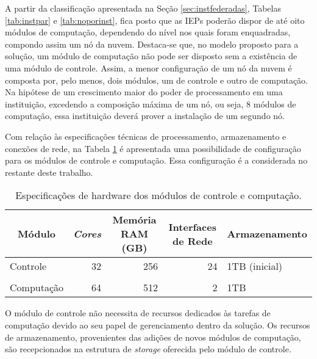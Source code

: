 \documentclass[tese,capa]{texufpel}
\begin{document}
A partir da classificação apresentada na Seção \ref{sec:instfederadas}, Tabelas \ref{tab:instpar} e \ref{tab:noporinst}, fica posto que as IEPs poderão dispor de até oito módulos de computação, dependendo do nível nos quais foram enquadradas, compondo assim um nó da nuvem. Destaca-se que, no modelo proposto para a solução, um módulo de computação não pode ser disposto sem a existência de uma módulo de controle. Assim, a menor configuração de um nó da nuvem é composta por, pelo menos, dois módulos, um de controle e outro de computação. Na hipótese de um crescimento maior do poder de processamento em uma instituição, excedendo a composição máxima de um nó, ou seja, 8 módulos de computação, essa instituição deverá prover a instalação de um segundo nó.

Com relação às especificações técnicas de processamento, armazenamento e conexões de rede, na Tabela \ref{tab:modulosespec} é apresentada uma possibilidade de configuração para os módulos de controle e computação. Essa configuração é a considerada no restante deste trabalho.

\begin{table}[H]
  \centering
  \caption{Especificações de hardware dos módulos de controle e computação.}
  \label{tab:modulosespec}
  \begin{tabular}{@{}lrrrl@{}}
  \toprule
  \multicolumn{1}{c}{\textbf{Módulo}} &
    \multicolumn{1}{c}{\textit{\textbf{Cores}}} &
    \multicolumn{1}{c}{\textbf{Memória RAM (GB)}} &
    \multicolumn{1}{c}{\textbf{Interfaces de Rede}} &
    \multicolumn{1}{c}{\textbf{Armazenamento}} \\ \midrule
  Controle   & 32 & 256 & 24 & 1TB (inicial) \\
             &    &     &    &               \\
  Computação & 64 & 512 & 2  & 1TB           \\ \bottomrule
  \end{tabular}
  \end{table}
  
O módulo de controle não necessita de recursos dedicados às tarefas de computação devido ao seu papel de gerenciamento dentro da solução. Os recursos de armazenamento, provenientes das adições de novos módulos de computação, são recepcionados na estrutura de \emph{storage} oferecida pelo módulo de controle. 

\end{document}
